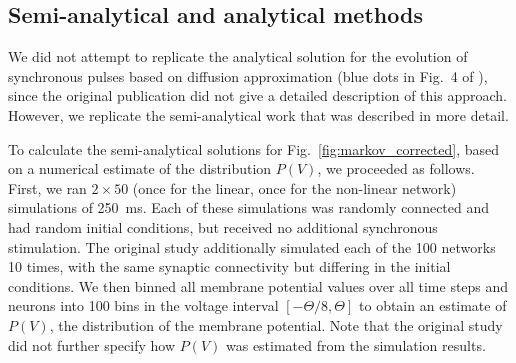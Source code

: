 \documentclass[10pt,a4paper,onecolumn]{article}
\begin{document}
\subsection*{Semi-analytical and analytical methods}
We did not attempt to replicate the analytical solution for the evolution of synchronous pulses based on diffusion approximation (blue dots in Fig.~4 of \cite{Memmesheimer2012}), since the original publication did not give a detailed description of this approach. However, we replicate the semi-analytical work that was described in more detail.

To calculate the semi-analytical solutions for Fig.~\ref{fig:markov_corrected}, based on a numerical estimate of the distribution $P(V)$, we proceeded as follows. First, we ran $2\times 50$ (once for the linear, once for the non-linear network) simulations of \SI{250}{\milli\second}. Each of these simulations was randomly connected and had random initial conditions, but received no additional synchronous stimulation. The original study additionally simulated each of the 100 networks 10 times, with the same synaptic connectivity but differing in the initial conditions. We then binned all membrane potential values over all time steps and neurons into 100 bins in the voltage interval $[-\Theta/8, \Theta]$ to obtain an estimate of $P(V)$, the distribution of the membrane potential. Note that the original study did not further specify how $P(V)$ was estimated from the simulation results.
\end{document}
